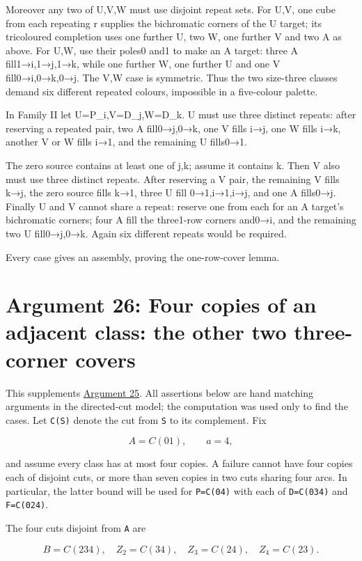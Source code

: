\documentclass[
  10pt,
]{article}
\begin{document}
Moreover any two of U,V,W must use disjoint repeat sets. For U,V, one
cube from each repeating r supplies the bichromatic corners of the U
target; its tricoloured completion uses one further U, two W, one
further V and two A as above. For U,W, use their poles0 and1 to make an
A target: three A fill1→i,1→j,1→k, while one further W, one further U
and one V fill0→i,0→k,0→j. The V,W case is symmetric. Thus the two
size-three classes demand six different repeated colours, impossible in
a five-colour palette.

In Family II let U=P\_i,V=D\_j,W=D\_k. U must use three distinct
repeats: after reserving a repeated pair, two A fill0→j,0→k, one V fills
i→j, one W fills i→k, another V or W fills i→1, and the remaining U
fills0→1.

The zero source contains at least one of j,k; assume it contains k. Then
V also must use three distinct repeats. After reserving a V pair, the
remaining V fills k→j, the zero source fills k→1, three U fill
0→1,i→1,i→j, and one A fills0→j. Finally U and V cannot share a repeat:
reserve one from each for an A target's bichromatic corners; four A fill
the three1-row corners and0→i, and the remaining two U fill0→j,0→k.
Again six different repeats would be required.

Every case gives an assembly, proving the one-row-cover lemma.

\hypertarget{arg-26}{%
\section{Argument 26: Four copies of an adjacent class: the other two
three-corner covers}\label{arg-26}}

This supplements \protect\hyperlink{arg-25}{Argument 25}. All assertions
below are hand matching arguments in the directed-cut model; the
computation was used only to find the cases. Let \texttt{C(S)} denote
the cut from \texttt{S} to its complement. Fix

\[
A=C(01),\qquad a=4,
\]

and assume every class has at most four copies. A failure cannot have
four copies each of disjoint cuts, or more than seven copies in two cuts
sharing four arcs. In particular, the latter bound will be used for
\texttt{P=C(04)} with each of \texttt{D=C(034)} and \texttt{F=C(024)}.

The four cuts disjoint from \texttt{A} are

\[
B=C(234),\quad Z_2=C(34),\quad Z_3=C(24),\quad Z_4=C(23).
\]
\end{document}

